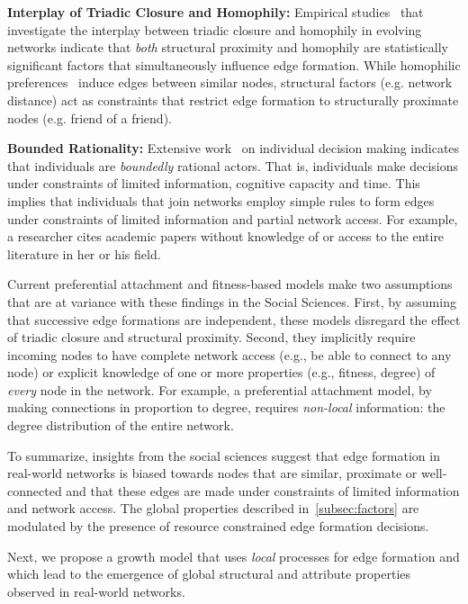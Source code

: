 \textbf{Interplay of Triadic Closure and Homophily:} Empirical studies~\cite{35626,block2014multidimensional} that investigate
the interplay between triadic closure and homophily in evolving networks
indicate that \textit{both} structural proximity and homophily are statistically
significant factors that simultaneously influence edge formation. While homophilic preferences~\cite{mcpherson2001birds} induce edges between similar nodes, structural factors (e.g. network distance) act as constraints that restrict edge formation to structurally proximate nodes (e.g. friend of a friend).

\textbf{Bounded Rationality:} Extensive work~\cite{simon1972theories,gigerenzer1996reasoning,lipman1995information}
on individual decision making indicates that individuals are \textit{boundedly}
rational actors. That is, individuals make decisions under constraints of limited information, cognitive capacity and time. This implies that individuals that join networks employ simple rules to form edges under constraints of limited information and partial network access. For example, a researcher cites academic papers without knowledge of or access
to the entire literature in her or his field.

Current preferential attachment and fitness-based models
\cite{dorogovtsev2000structure,kim2017effect,singh2017relay,barabasi1999emergence} make two assumptions that are at variance with these findings in the Social Sciences. First, by assuming that successive edge formations are independent, these models disregard the effect of triadic closure and structural proximity. Second, they implicitly require incoming nodes to have complete network access (e.g., be able to connect to any node) or explicit knowledge of one or more properties (e.g., fitness, degree) of \textit{every} node in the network. For example, a preferential attachment model, by making connections in proportion to degree, requires \textit{non-local} information: the degree distribution of the entire network.

To summarize, insights from the social sciences suggest that edge formation in real-world networks is biased towards nodes that are similar, proximate or well-connected and that
these edges are made under constraints of limited information and network access.
The global properties described in~\cref{subsec:factors} are modulated by the presence of
resource constrained edge formation decisions.

Next, we propose a growth model that uses \textit{local} processes for
edge formation and which lead to the emergence of global structural and attribute properties observed in real-world networks.

